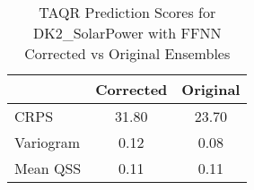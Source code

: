 
    \begin{table}[h!]
    \centering
    \begin{tabular}{|l|c|c|}
    \hline
    \textbf{} & \textbf{Corrected} & \textbf{Original} \\ \hline
    CRPS       & 31.80       & 23.70      \\ \hline
    Variogram  & 0.12  & 0.08 \\ \hline
    Mean QSS   & 0.11        & 0.11       \\ \hline
    \end{tabular}
    \caption{TAQR Prediction Scores for DK2_SolarPower with FFNN Corrected vs Original Ensembles}
    \label{tab:comparison}
    \end{table}
    